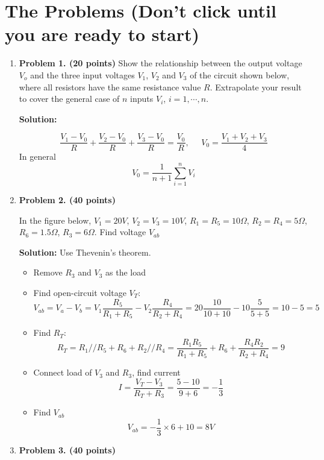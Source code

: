 \documentclass{article}
\begin{document}
\section*{The Problems (Don't click until you are ready to start)}
\begin{enumerate}

\item {\bf Problem 1. (20 points)} 
Show the relationship between the output voltage $V_o$ and the three input
voltages $V_1$, $V_2$ and $V_3$ of the circuit shown below, where all 
resistors have the same resistance value $R$. Extrapolate your result to 
cover the general case of $n$ inputs $V_i$, $i=1,\cdots,n$.


{\bf Solution:}

\[ \frac{V_1-V_0}{R}+\frac{V_2-V_0}{R}+\frac{V_3-V_0}{R}=\frac{V_0}{R}
,\;\;\;\;\; V_0=\frac{V_1+V_2+V_3}{4}	\]
In general
\[ V_0=\frac{1}{n+1}\sum_{i=1}^n V_i \]


\item {\bf Problem 2. (40 points)} 

In the figure below, $V_1=20V$, $V_2=V_3=10V$, $R_1=R_5=10\Omega$, 
$R_2=R_4=5\Omega$, $R_6=1.5\Omega$, $R_3=6\Omega$. Find voltage $V_{ab}$


{\bf Solution:} Use Thevenin's theorem. 
\begin{itemize}
\item Remove $R_3$ and $V_3$ as the load
\item Find open-circuit voltage $V_T$:
\[	V_{ab}=V_a-V_b=V_1\frac{R_5}{R_1+R_5}-V_2\frac{R_4}{R_2+R_4}
	=20 \frac{10}{10+10}-10 \frac{5}{5+5}=10-5=5 \]
\item Find $R_T$:
\[	R_T=R_1//R_5+R_6+R_2//R_4
	=\frac{R_1R_5}{R_1+R_5}+R_6+\frac{R_4R_2}{R_2+R_4}=9 \]
\item Connect load of $V_3$ and $R_3$, find current
\[	I=\frac{V_T-V_3}{R_T+R_3}=\frac{5-10}{9+6}=-\frac{1}{3} \]
\item Find $V_{ab}$
\[	V_{ab}=-\frac{1}{3}\times 6 +10=8V	\]
\end{itemize}

\item {\bf Problem 3. (40 points)} 


\end{enumerate}
\end{document}
